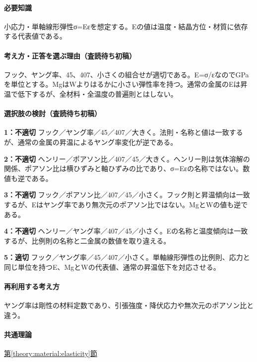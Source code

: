 \paragraph{必要知識} 小応力・単軸線形弾性σ=Eεを想定する。Eの値は温度・結晶方位・材質に依存する代表値である。

\paragraph{考え方・正答を選ぶ理由（査読待ち初稿）} フック、ヤング率、45、407、小さくの組合せが適切である。E=σ/εなのでGPaを単位とする。MgはWよりはるかに小さい弾性率を持つ。通常の金属のEは昇温で低下するが、全材料・全温度の普遍則とはしない。

\paragraph{選択肢の検討（査読待ち初稿）}\mbox{}\par

\noindent\textbf{1：不適切} フック／ヤング率／45／407／大きく。法則・名称と値は一致するが、通常の金属の昇温によるヤング率変化が逆である。\par

\noindent\textbf{2：不適切} ヘンリー／ポアソン比／407／45／大きく。ヘンリー則は気体溶解の関係、ポアソン比は横ひずみと軸ひずみの比であり、σ=Eεの名称ではない。数値も逆である。\par

\noindent\textbf{3：不適切} フック／ポアソン比／407／45／小さく。フック則と昇温傾向は一致するが、Eはヤング率であり無次元のポアソン比ではない。MgとWの値も逆である。\par

\noindent\textbf{4：不適切} ヘンリー／ヤング率／407／45／小さく。Eの名称と温度傾向は一致するが、比例則の名称と二金属の数値を取り違える。\par

\noindent\textbf{5：適切} フック／ヤング率／45／407／小さく。単軸線形弾性の比例則、応力と同じ単位を持つE、MgとWの代表値、通常の昇温低下を対応させる。\par

\paragraph{再利用する考え方} ヤング率は剛性の材料定数であり、引張強度・降伏応力や無次元のポアソン比と違う。

\paragraph{共通理論} \hyperref[theory:material:elasticity]{第\ref*{theory:material:elasticity}節}

